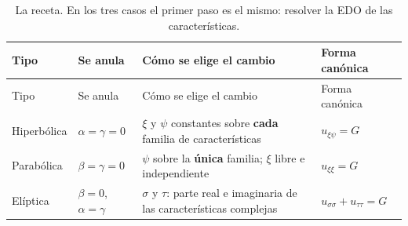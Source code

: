 \documentclass[
  spanish,
  a4paper,
]{scrbook}
\theoremstyle{definition}
\theoremstyle{plain}
\theoremstyle{definition}
\theoremstyle{plain}
\theoremstyle{definition}
\theoremstyle{remark}
\begin{document}
\begin{longtable}[]{@{}
  >{\raggedright\arraybackslash}p{}
  >{\raggedright\arraybackslash}p{}
  >{\raggedright\arraybackslash}p{}
  >{\raggedright\arraybackslash}p{}@{}}
\caption{La receta. En los tres casos el primer paso es el mismo:
resolver la EDO de las características.}\tabularnewline
\toprule\noalign{}
\begin{minipage}[b]{\linewidth}\raggedright
Tipo
\end{minipage} & \begin{minipage}[b]{\linewidth}\raggedright
Se anula
\end{minipage} & \begin{minipage}[b]{\linewidth}\raggedright
Cómo se elige el cambio
\end{minipage} & \begin{minipage}[b]{\linewidth}\raggedright
Forma canónica
\end{minipage} \\
\midrule\noalign{}
\endfirsthead
\toprule\noalign{}
\begin{minipage}[b]{\linewidth}\raggedright
Tipo
\end{minipage} & \begin{minipage}[b]{\linewidth}\raggedright
Se anula
\end{minipage} & \begin{minipage}[b]{\linewidth}\raggedright
Cómo se elige el cambio
\end{minipage} & \begin{minipage}[b]{\linewidth}\raggedright
Forma canónica
\end{minipage} \\
\midrule\noalign{}
\endhead
\bottomrule\noalign{}
\endlastfoot
Hiperbólica & \(\alpha = \gamma = 0\) & \(\xi\) y \(\psi\) constantes
sobre \textbf{cada} familia de características & \(u_{\xi\psi} = G\) \\
Parabólica & \(\beta = \gamma = 0\) & \(\psi\) sobre la \textbf{única}
familia; \(\xi\) libre e independiente & \(u_{\xi\xi} = G\) \\
Elíptica & \(\beta=0\), \(\alpha=\gamma\) & \(\sigma\) y \(\tau\): parte
real e imaginaria de las características complejas &
\(u_{\sigma\sigma}+u_{\tau\tau} = G\) \\
\end{longtable}
\end{document}
